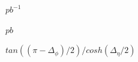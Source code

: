 \documentclass{article}
\begin{document}
$pb^{-1}$
\pagebreak

$pb$
\pagebreak

$ tan((\pi - \Delta_{\phi})/2)/cosh(\Delta_{\eta}/2)$
\pagebreak
\end{document}
